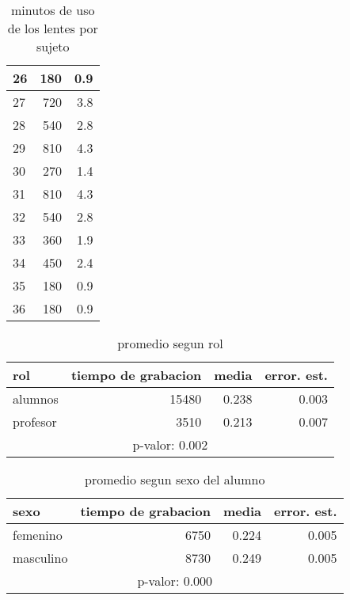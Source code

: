 \documentclass[spanish]{article}
\begin{document}
\begin{table}[h!]
\begin{center}
\begin{tabular}{|l|r|r|}
    26 &              180 &            0.9\\ \hline
    27 &              720 &            3.8\\ \hline
    28 &              540 &            2.8\\ \hline
    29 &              810 &            4.3\\ \hline
    30 &              270 &            1.4\\ \hline
    31 &              810 &            4.3\\ \hline
    32 &              540 &            2.8\\ \hline
    33 &              360 &            1.9\\ \hline
    34 &              450 &            2.4\\ \hline
    35 &              180 &            0.9\\ \hline
    36 &              180 &            0.9\\ \hline
\end{tabular}
\caption{minutos de uso de los lentes por sujeto}
\end{center}
\end{table}

\begin{table}[h!]
\begin{center}
\begin{tabular}{|l|r|r|r|}
\hline
rol      & tiempo de grabacion & media         & error. est.     \\ \hline
alumnos  &               15480 &         0.238 &            0.003\\ \hline
profesor &                3510 &         0.213 &            0.007\\ \hline
\multicolumn{4}{|c|}{p-valor: 0.002} \\ \hline
\end{tabular}
\caption{promedio segun rol}
\end{center}
\end{table}

\begin{table}[h!]
\begin{center}
\begin{tabular}{|l|r|r|r|}
\hline
sexo      & tiempo de grabacion & media          & error. est.     \\ \hline
femenino  &                6750 &          0.224 &            0.005\\ \hline
masculino &                8730 &          0.249 &            0.005\\ \hline
\multicolumn{4}{|c|}{p-valor: 0.000} \\ \hline
\end{tabular}
\caption{promedio segun sexo del alumno}
\end{center}
\end{table}
\end{document}
